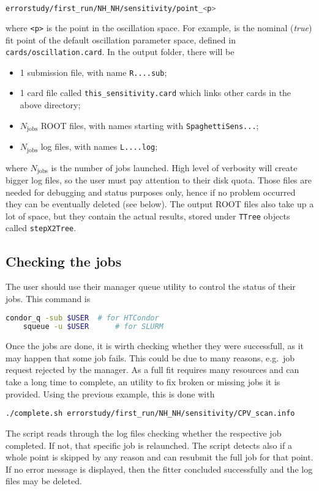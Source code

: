 \documentclass[a4paper, 11pt]{article}
\begin{document}
\begin{lstlisting}[language=bash]
	errorstudy/first_run/NH_NH/sensitivity/point_<p>
\end{lstlisting}
where \texttt{<p>} is the point in the oscillation space. For example,  is the nominal (\emph{true}) %
fit point of the default oscillation parameter space, defined in \texttt{cards/oscillation.card}.
In the output folder, there will be
\begin{itemize}
		\small
	\item 1 submission file, with name \texttt{R....sub};
	\item 1 card file called \texttt{this\_sensitivity.card} which links other cards in the above directory;
	\item $N_\text{jobs}$ ROOT files, with names starting with \texttt{SpaghettiSens...};
	\item $N_\text{jobs}$ log files, with names \texttt{L....log};
\end{itemize}
where $N_\text{jobs}$ is the number of jobs launched.
High level of verbosity will create bigger log files, so the user must pay attention to their disk quota.
Those files are needed for debugging and status purposes only, %
hence if no problem occurred they can be eventually deleted (see below).
The output ROOT files also take up a lot of space, but they contain the actual results, stored under \texttt{TTree} objects called \texttt{stepX2Tree}.

\subsection{Checking the jobs}

The user should use their manager queue utility to control the status of their jobs.
This command is
\begin{lstlisting}[language=bash]
	condor_q -sub $USER  # for HTCondor
	squeue -u $USER      # for SLURM
\end{lstlisting}
Once the jobs are done, it is wirth checking whether they were successfull, %
as it may happen that some job fails.
This could be due to many reasons, e.g.\ job request rejected by the manager.
As a full fit requires many resources and can take a long time to complete, %
an utility to fix broken or missing jobs it is provided.
Using the previous example, this is done with
\begin{lstlisting}[]
	./complete.sh errorstudy/first_run/NH_NH/sensitivity/CPV_scan.info
\end{lstlisting}
The script reads through the log files checking whether the respective job completed.
If not, that specific job is relaunched.
The script detects also if a whole point is skipped by any reason and can resubmit the full job for that point.
If no error message is displayed, then the fitter concluded successfully and the log files may be deleted.
\end{document}
